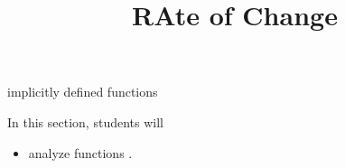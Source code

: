 \documentclass{ximera}
\title{RAte of Change}
\begin{document}
\begin{abstract}
%
\end{abstract}
\maketitle


implicitly defined functions


\begin{sectionOutcomes}
In this section, students will 

\begin{itemize}
\item analyze functions .
\end{itemize}
\end{sectionOutcomes}
\end{document}
